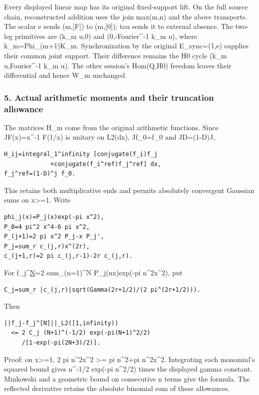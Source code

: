 Every displayed linear map has its original fixed-support lift. On the full source chain,
reconstructed addition uses the join max(m,n) and the above transports. The scalar e sends
(m,{[}F{]}) to (m,{[}0{]}); tau sends it to external absence. The two-leg primitives are (k\_m u,0)
and (0,-Fourier\^{}-1 k\_m u), where k\_m=Phi\_(m+1)K\_m. Synchronization by the original
E\_sync=(1,e) supplies their common joint support. Their difference remains the H0 cycle (k\_m
u,Fourier\^{}-1 k\_m u). The other session's Hom(Q,H0) freedom leaves their differential and hence
W\_m unchanged.

\subsubsection{5. Actual arithmetic moments and their truncation
allowance}\label{pr_13:actual-arithmetic-moments-and-their-truncation-allowance}

The matrices H\_m come from the original arithmetic functions. Since JF(x)=x\^{}-1 F(1/x) is unitary
on L2(dx), Jf\_0=f\_0 and JD=(1-D)J,

\begin{verbatim}
H_ij=integral_1^infinity [conjugate(f_i)f_j
             +conjugate(f_i^ref)f_j^ref] dx,
f_j^ref=(1-D)^j f_0.
\end{verbatim}

This retains both multiplicative ends and permits absolutely convergent Gaussian sums on
x\textgreater=1. Write

\begin{verbatim}
phi_j(x)=P_j(x)exp(-pi x^2),
P_0=4 pi^2 x^4-6 pi x^2,
P_(j+1)=2 pi x^2 P_j-x P_j',
P_j=sum_r c_(j,r)x^(2r),
c_(j+1,r)=2 pi c_(j,r-1)-2r c_(j,r).
\end{verbatim}

For f\_j\^{}\href{x}{N}=2 sum\_(n=1)\^{}N P\_j(nx)exp(-pi n\^{}2x\^{}2), put

\begin{verbatim}
C_j=sum_r |c_(j,r)|sqrt(Gamma(2r+1/2)/(2 pi^(2r+1/2))).
\end{verbatim}

Then

\begin{verbatim}
||f_j-f_j^[N]||_L2([1,infinity))
  <= 2 C_j (N+1)^(-1/2) exp(-pi(N+1)^2/2)
     /[1-exp(-pi(2N+3)/2)].
\end{verbatim}

Proof: on x\textgreater=1, 2 pi n\^{}2x\^{}2 \textgreater= pi n\^{}2+pi n\^{}2x\^{}2. Integrating
each monomial's squared bound gives n\^{}-1/2 exp(-pi n\^{}2/2) times the displayed gamma constant.
Minkowski and a geometric bound on consecutive n terms give the formula. The reflected derivative
retains the absolute binomial sum of these allowances.

